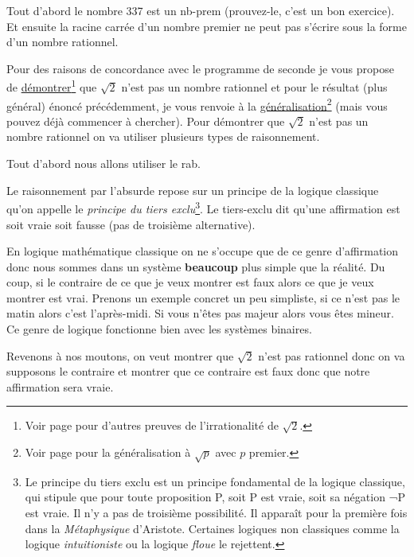 \documentclass[a4paper,11pt]{book}
\begin{document}
Tout d'abord le nombre 337 est un \gls{nb-prem}
(prouvez-le, c'est un bon exercice). Et ensuite la racine carrée d'un
nombre premier ne peut pas s'écrire sous la forme d'un nombre
rationnel.

Pour des raisons de concordance avec le programme de seconde je
vous propose de \hyperref[orgea5a5bb]{démontrer}\footnote{Voir page \pageref{page:sqrt2proofs} pour d'autres preuves
de l'irrationalité de \(\sqrt{2}\).} que \(\sqrt{2}\)
n'est pas un nombre rationnel et pour le résultat (plus général)
énoncé précédemment, je vous renvoie à la \hyperref[org24a50ec]{généralisation}\footnote{Voir page \pageref{page:sec2.6.6gen} pour la généralisation à
\(\sqrt{p}\) avec \(p\) premier.} (mais
vous pouvez déjà commencer à chercher).
Pour démontrer que \(\sqrt{2}\) n'est pas un
nombre rationnel
on va utiliser plusieurs types de raisonnement.

Tout d'abord nous allons utiliser le
\gls{rab}.


Le raisonnement par l'absurde repose sur un principe de la logique
classique qu'on appelle le \emph{principe du tiers exclu}\footnote{Le principe du tiers exclu est un principe
fondamental de la logique classique, qui stipule que pour toute
proposition P, soit P est vraie, soit sa négation ¬P est vraie. Il n'y
a pas de troisième possibilité. Il apparaît pour la première fois dans
la \emph{Métaphysique} d'Aristote. Certaines logiques non classiques comme
la logique \emph{intuitioniste} ou la logique \emph{floue} le rejettent.}.
Le \gls{tiers-exclu} dit qu'une affirmation
est soit vraie soit fausse (pas de troisième alternative).


En logique mathématique classique on ne s'occupe que de ce genre
d'affirmation donc nous sommes dans un système \textbf{beaucoup} plus simple
que la réalité. Du coup, si le contraire de ce que je veux montrer est
faux alors ce que je veux montrer est vrai. Prenons un exemple concret
un peu simpliste, si ce n'est pas le matin alors c'est
l'après-midi. Si vous n'êtes pas majeur alors vous êtes mineur. Ce
genre de logique fonctionne bien avec les systèmes binaires.



Revenons à nos moutons, on veut montrer que \(\sqrt{2}\) n'est pas
rationnel donc on va supposons le contraire et montrer que ce
contraire est faux donc que notre affirmation sera vraie.
\end{document}
